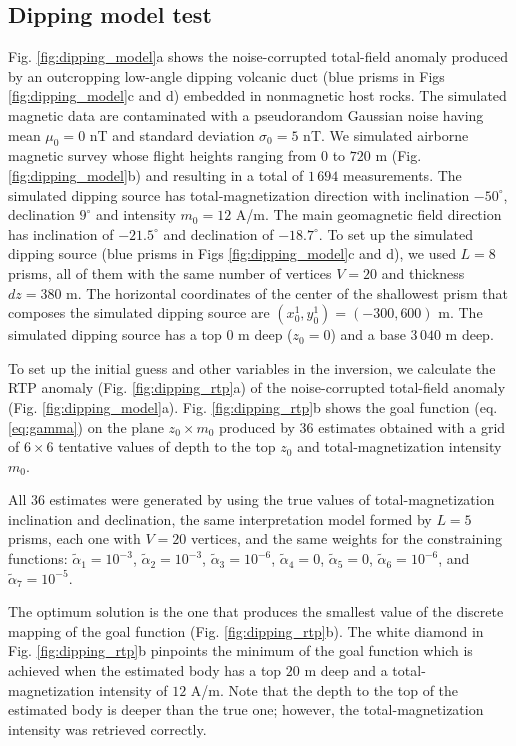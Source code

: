 \subsection{Dipping model test}

Fig. \ref{fig:dipping_model}a shows the noise-corrupted total-field anomaly produced by an outcropping low-angle dipping volcanic duct (blue prisms in Figs \ref{fig:dipping_model}c and d) embedded in nonmagnetic host rocks. 
The simulated magnetic data are contaminated with a pseudorandom Gaussian noise having mean $ \mu_0=0 $ nT and standard deviation $ \sigma_0 = 5 $ nT.
We simulated airborne magnetic survey whose flight heights ranging from 0 to $ 720 $ m
(Fig. \ref{fig:dipping_model}b) and resulting in a total of $ 1\,694 $ measurements.
The simulated dipping source has total-magnetization direction with inclination 
$ -50^\circ $, declination $ 9^\circ $ and intensity $ m_0 = 12 $ A/m.
The main geomagnetic field direction has inclination of $ -21.5^\circ $ and declination of $ -18.7^\circ $.
To set up the simulated dipping source (blue prisms in Figs \ref{fig:dipping_model}c and d),
we used $L=8$ prisms, all of them with the same number of vertices $ V = 20 $ and thickness 
$ dz = 380 $ m. 
The horizontal coordinates of the center of the shallowest prism that composes the
simulated dipping source are $ (x_0^1, y_0^1) = (-300, 600) $ m. 
The simulated dipping source has a top 0 m deep ($z_0 = 0$) and a base $ 3\,040 $ m deep.

To set up the initial guess and other variables in the inversion, we calculate the RTP anomaly (Fig. \ref{fig:dipping_rtp}a) of the noise-corrupted total-field anomaly (Fig. \ref{fig:dipping_model}a).
Fig. \ref{fig:dipping_rtp}b shows the goal function (eq. \ref{eq:gamma}) on the plane 
$z_0 \times m_0 $ produced by 36 estimates obtained with a grid of $6 \times 6$ tentative values of depth to the top $z_0$ and total-magnetization intensity $m_0$. 

All $ 36 $ estimates were generated by using the true values of total-magnetization inclination and declination, the same interpretation model formed by $ L = 5 $ prisms, 
each one with $ V = 20 $ vertices, and the same weights for the constraining functions: 
$\tilde{\alpha}_1 = 10^{-3}$, 
$\tilde{\alpha}_2 = 10^{-3}$, 
$\tilde{\alpha}_3 = 10^{-6}$, 
$\tilde{\alpha}_4 = 0$, 
$\tilde{\alpha}_5 = 0$, 
$\tilde{\alpha}_6 = 10^{-6}$, and 
$\tilde{\alpha}_7 = 10^{-5}$. 


The optimum solution is the one that produces the smallest value of the discrete mapping 
of the goal function (Fig. \ref{fig:dipping_rtp}b). 
The white diamond in Fig. \ref{fig:dipping_rtp}b pinpoints the minimum of the goal function which is achieved when the estimated body has a top $ 20 $ m deep and a total-magnetization intensity of $ 12 $ A/m. 
Note that the depth to the top of the estimated body is deeper than the true one; 
however, the total-magnetization intensity was retrieved correctly.

